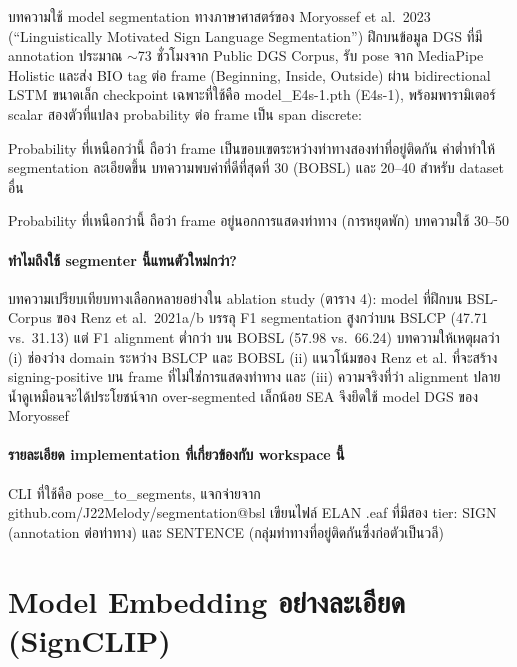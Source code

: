 \documentclass[11pt,a4paper]{article}
\def\texttt#1{#1}%
\def\emph#1{#1}%
\begin{document}
บทความใช้ model segmentation ทางภาษาศาสตร์ของ Moryossef et al.\ 2023
(\emph{``Linguistically Motivated Sign Language Segmentation''})
ฝึกบนข้อมูล DGS ที่มี annotation ประมาณ $\sim$73 ชั่วโมงจาก Public DGS Corpus,
รับ pose จาก MediaPipe Holistic และส่ง BIO tag ต่อ frame (\textsc{B}eginning,
\textsc{I}nside, \textsc{O}utside) ผ่าน bidirectional LSTM ขนาดเล็ก
checkpoint เฉพาะที่ใช้คือ \texttt{model\_E4s-1.pth} (\texttt{E4s-1}),
พร้อมพารามิเตอร์ scalar สองตัวที่แปลง probability ต่อ frame เป็น span discrete:
\begin{description}[leftmargin=1.6em,style=nextline]
  \item[\texttt{b-threshold} (ช่วง 0--100)] Probability ที่เหนือกว่านี้
  ถือว่า frame เป็นขอบเขตระหว่างท่าทางสองท่าที่อยู่ติดกัน ค่าต่ำทำให้ segmentation ละเอียดขึ้น
  บทความพบค่าที่ดีที่สุดที่ 30 (BOBSL) และ 20--40 สำหรับ dataset อื่น
  \item[\texttt{o-threshold} (ช่วง 0--100)] Probability ที่เหนือกว่านี้
  ถือว่า frame อยู่นอกการแสดงท่าทาง (การหยุดพัก) บทความใช้ 30--50
\end{description}

\paragraph{ทำไมถึงใช้ segmenter นี้แทนตัวใหม่กว่า?}
บทความเปรียบเทียบทางเลือกหลายอย่างใน ablation study (ตาราง 4):
model ที่ฝึกบน BSL-Corpus ของ Renz et al.\ 2021a/b บรรลุ F1 \emph{segmentation}
สูงกว่าบน BSLCP (47.71 vs.\ 31.13) แต่ F1 alignment \emph{ต่ำกว่า} บน BOBSL
(57.98 vs.\ 66.24) บทความให้เหตุผลว่า (i) ช่องว่าง domain ระหว่าง BSLCP และ BOBSL
(ii) แนวโน้มของ Renz et al. ที่จะสร้าง signing-positive บน frame ที่ไม่ใช่การแสดงท่าทาง
และ (iii) ความจริงที่ว่า alignment ปลายน้ำดูเหมือนจะได้ประโยชน์จาก
\emph{over-segmented เล็กน้อย} SEA จึงยึดใช้ model DGS ของ Moryossef

\paragraph{รายละเอียด implementation ที่เกี่ยวข้องกับ workspace นี้}
CLI ที่ใช้คือ \texttt{pose\_to\_segments}, แจกจ่ายจาก
\texttt{github.com/J22Melody/segmentation@bsl} เขียนไฟล์ ELAN \texttt{.eaf}
ที่มีสอง tier: \texttt{SIGN} (annotation ต่อท่าทาง) และ \texttt{SENTENCE}
(กลุ่มท่าทางที่อยู่ติดกันซึ่งก่อตัวเป็นวลี)


\section{Model Embedding อย่างละเอียด (SignCLIP)}
\label{sec:paper-emb}
\end{document}
